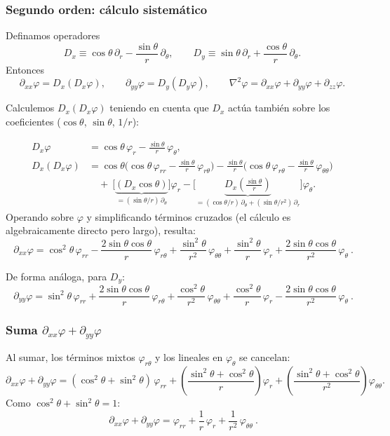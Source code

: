 \documentclass{article}
\begin{document}
\subsubsection*{Segundo orden: cálculo sistemático}
Definamos operadores
\[
D_x\equiv \cos\theta\,\partial_r - \frac{\sin\theta}{r}\,\partial_\theta,\qquad
D_y\equiv \sin\theta\,\partial_r + \frac{\cos\theta}{r}\,\partial_\theta.
\]
Entonces
\[
\partial_{xx}\varphi=D_x(D_x\varphi),\qquad
\partial_{yy}\varphi=D_y(D_y\varphi),\qquad
\nabla^{2}\varphi=\partial_{xx}\varphi+\partial_{yy}\varphi+\partial_{zz}\varphi.
\]

Calculemos $D_x(D_x\varphi)$ teniendo en cuenta que $D_x$ actúa también sobre los coeficientes ($\cos\theta$, $\sin\theta$, $1/r$):

\[
\begin{aligned}
D_x\varphi&=\cos\theta\,\varphi_r - \frac{\sin\theta}{r}\,\varphi_\theta,\\
D_x(D_x\varphi)
&=\cos\theta\Big(\cos\theta\,\varphi_{rr} - \frac{\sin\theta}{r}\,\varphi_{r\theta}\Big)
- \frac{\sin\theta}{r}\Big(\cos\theta\,\varphi_{r\theta} - \frac{\sin\theta}{r}\,\varphi_{\theta\theta}\Big)\\
&\quad +\ \Big[\underbrace{(D_x\cos\theta)}_{=(\sin\theta/r)\,\partial_\theta}\Big]\varphi_r
-\Big[\underbrace{D_x\!\left(\frac{\sin\theta}{r}\right)}_{=(\cos\theta/r)\,\partial_\theta + (\sin\theta/r^{2})\,\partial_r}\Big]\varphi_\theta.
\end{aligned}
\]
Operando sobre $\varphi$ y simplificando términos cruzados (el cálculo es algebraicamente directo pero largo), resulta:
\[
\boxed{\ \partial_{xx}\varphi
=\cos^{2}\theta\,\varphi_{rr}
- \frac{2\sin\theta\cos\theta}{r}\,\varphi_{r\theta}
+\frac{\sin^{2}\theta}{r^{2}}\,\varphi_{\theta\theta}
+\frac{\sin^{2}\theta}{r}\,\varphi_{r}
+\frac{2\sin\theta\cos\theta}{r^{2}}\,\varphi_{\theta}\ .}
\]

De forma análoga, para $D_y$:
\[
\boxed{\ \partial_{yy}\varphi
=\sin^{2}\theta\,\varphi_{rr}
+ \frac{2\sin\theta\cos\theta}{r}\,\varphi_{r\theta}
+\frac{\cos^{2}\theta}{r^{2}}\,\varphi_{\theta\theta}
+\frac{\cos^{2}\theta}{r}\,\varphi_{r}
-\frac{2\sin\theta\cos\theta}{r^{2}}\,\varphi_{\theta}\ .}
\]

\subsubsection*{Suma $\partial_{xx}\varphi+\partial_{yy}\varphi$}
Al sumar, los términos mixtos $\varphi_{r\theta}$ y los lineales en $\varphi_\theta$ se cancelan:
\[
\partial_{xx}\varphi+\partial_{yy}\varphi
=(\cos^{2}\theta+\sin^{2}\theta)\,\varphi_{rr}
+\left(\frac{\sin^{2}\theta+\cos^{2}\theta}{r}\right)\varphi_{r}
+\left(\frac{\sin^{2}\theta+\cos^{2}\theta}{r^{2}}\right)\varphi_{\theta\theta}.
\]
Como $\cos^{2}\theta+\sin^{2}\theta=1$:
\[
\boxed{\ \partial_{xx}\varphi+\partial_{yy}\varphi
=\varphi_{rr}+\frac{1}{r}\,\varphi_{r}+\frac{1}{r^{2}}\,\varphi_{\theta\theta}\ .}
\]
\end{document}
